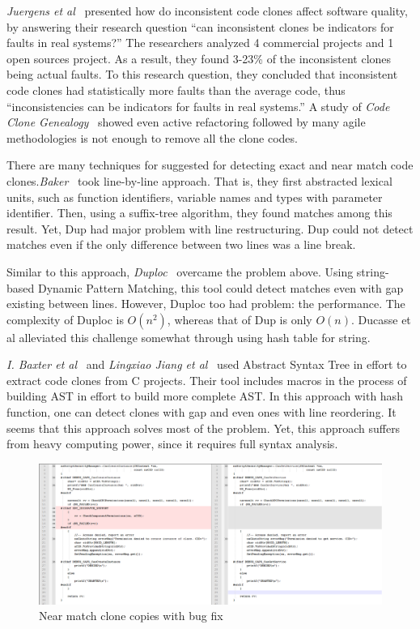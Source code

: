 \documentclass[nocopyrightspace]{sigplanconf}
\begin{document}
\vspace{10 pt}
\noindent
\emph{Juergens et al}~\cite{Juergens2009} presented how do inconsistent code clones affect software quality, by answering their research question “can inconsistent clones be indicators for faults in real systems?” The researchers analyzed 4 commercial projects and 1 open sources project. As a result, they found 3-23\% of the inconsistent clones being actual faults. To this research question, they concluded that inconsistent code clones had statistically more faults than the average code, thus “inconsistencies can be indicators for faults in real systems.” A study of \emph{Code Clone Genealogy}~\cite{Kim2005} showed even active refactoring followed by many agile methodologies is not enough to remove all the clone codes.

\vspace{10 pt}
\noindent
There are many techniques for suggested for detecting exact and near match code clones.\emph{Baker}~\citep{Baker1995} took line-by-line approach. That is, they first abstracted lexical units, such as function identifiers, variable names and types with parameter identifier. Then, using a suffix-tree algorithm, they found matches among this result. Yet, Dup had major problem with line restructuring. Dup could not detect matches even if the only difference between two lines was a line break. 

\vspace{10 pt}
\noindent
Similar to this approach, \emph{Duploc}~\cite{Ducasse1999} overcame the problem above. Using string-based Dynamic Pattern Matching, this tool could detect matches even with gap existing between lines. However, Duploc too had problem: the performance. The complexity of Duploc is $O(n^2)$, whereas that of Dup is only $O(n)$. Ducasse et al alleviated this challenge somewhat through using hash table for string.

\vspace{10 pt}
\noindent
\emph{I. Baxter et al}~\cite{Baxter1998} and \emph{Lingxiao Jiang et al}~\cite{Jiang2007} used Abstract Syntax Tree in effort to extract code clones from C projects. Their tool includes macros in the process of building AST in effort to build more complete AST. In this approach with hash function, one can detect clones with gap and even ones with line reordering. It seems that this approach solves most of the problem. Yet, this approach suffers from heavy computing power, since it requires full syntax analysis.
\begin{figure}[t!]
\centering
\includegraphics[width=\textwidth]{BugCase.png}
\caption{Near match clone copies with bug fix}
\label{fig:buggy}
\end{figure}
\end{document}
